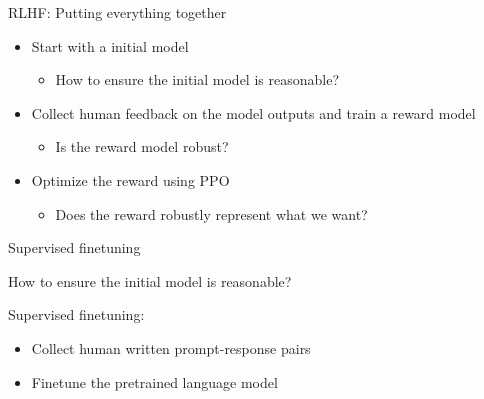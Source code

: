\documentclass[usenames,dvipsnames,notes,11pt,aspectratio=169,hyperref={colorlinks=true, linkcolor=blue}]{beamer}
\begin{document}
\begin{frame}{RLHF: Putting everything together}
    \begin{itemize}
        \itemsep1em
        \item Start with a initial model 
            \begin{itemize}[<2->]
                \item How to ensure the initial model is reasonable?
            \end{itemize}
        \item Collect human feedback on the model outputs and train a reward model
            \begin{itemize}[<2->]
                \item Is the reward model robust? 
            \end{itemize}
        \item Optimize the reward using PPO 
            \begin{itemize}[<2->]
                \item Does the reward robustly represent what we want? 
            \end{itemize}
    \end{itemize}
\end{frame}

\begin{frame}
    {Supervised finetuning}

    How to ensure the initial model is reasonable?

    Supervised finetuning:
    \begin{itemize}
        \item Collect human written prompt-response pairs
        \item Finetune the pretrained language model
    \end{itemize}
\end{frame}
\end{document}
